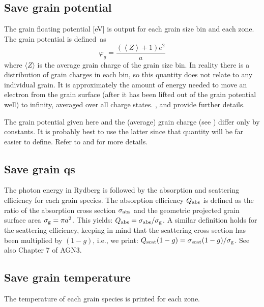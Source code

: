 \subsection{Save grain potential}

 The grain floating potential [eV] is output for each grain size bin and
each zone. The grain potential is defined~as
\begin{equation}
\varphi _g  = \frac{{\left( {\left\langle Z \right\rangle  + 1} \right)e^2
}}{a}
\end{equation}
where $\langle Z\rangle$ is the average grain charge of the grain size bin.  In reality
there is a distribution of grain charges in each bin, so this quantity does
not relate to any individual grain. It is approximately the amount of energy
needed to move an electron from the grain surface (after it has been lifted
out of the grain potential well) to infinity, averaged over all charge
states.
\citet{Weingartner2001a}, \citet{VanHoof2004} and \citet{Weingartner2006} provide further details.

The grain potential given here and the (average) grain charge
(see ) differ only by constants.  It
is probably best to use the latter since that quantity will be far easier
to define. Refer to \citet{Weingartner2001a} and
\citet{VanHoof2004}
for more details.

\subsection{Save grain qs}

The photon energy in Rydberg is followed by the absorption and scattering
efficiency for each grain species. The absorption efficiency $Q_{\rm abs}$ is
defined as the ratio of the absorption cross section $\sigma_{\rm abs}$ and
the geometric projected grain surface area $\sigma_{\rm g} = \pi a^2$. This
yields: $Q_{\rm abs} = \sigma_{\rm abs}/\sigma_{\rm g}$. A similar definition
holds for the scattering efficiency, keeping in mind that the scattering cross
section has been multiplied by $(1-g)$, i.e., we print: $Q_{\rm scat} (1-g) =
\sigma_{\rm scat} (1-g) / \sigma_{\rm g}$. See also Chapter 7 of AGN3.

\subsection{Save grain temperature}

The temperature of each grain species is printed for each zone.

